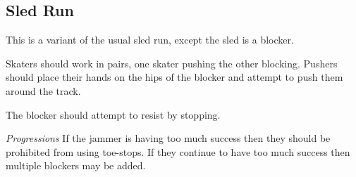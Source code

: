 \subsection{Sled Run}

This is a variant of the usual sled run, except the sled is a blocker.

Skaters should work in pairs, one skater pushing the other blocking.
Pushers should place their hands on the hips of the blocker and attempt to push them around the track.

The blocker should attempt to resist by stopping. 


{\it Progressions}
If the jammer is having too much success then they should be prohibited from using toe-stops.
If they continue to have too much success then multiple blockers may be added.

